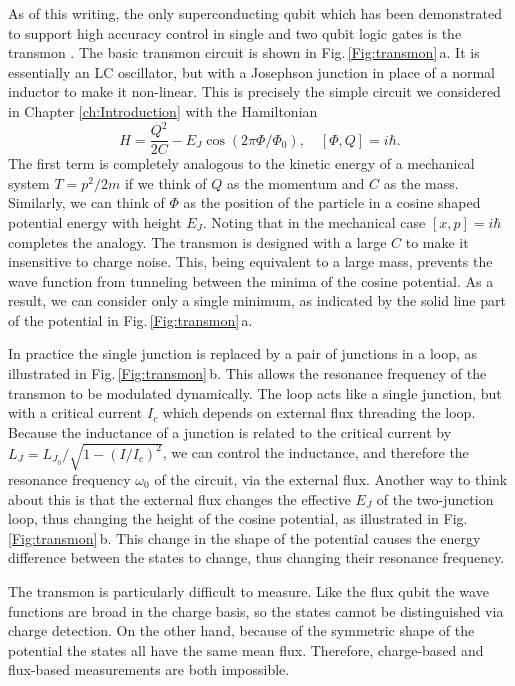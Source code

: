 As of this writing, the only superconducting qubit which has been demonstrated to support high accuracy control in single and two qubit logic gates is the transmon \cite{Koch:transmon2007, Barends:gates2014}.
The basic transmon circuit is shown in Fig.\,\ref{Fig:transmon}\,a.
It is essentially an LC oscillator, but with a Josephson junction in place of a normal inductor to make it non-linear.
This is precisely the simple circuit we considered in Chapter \ref{ch:Introduction} with the Hamiltonian \begin{equation}
H = \frac{Q^2}{2C} - E_J \cos \left( 2\pi \Phi / \Phi_0 \right), \quad [\Phi, Q]=i\hbar. \end{equation}
The first term is completely analogous to the kinetic energy of a mechanical system $T = p^2 / 2m$ if we think of $Q$ as the momentum and $C$ as the mass.
Similarly, we can think of $\Phi$ as the position of the particle in a cosine shaped potential energy with height $E_J$.
Noting that in the mechanical case $[x,p]=i\hbar$ completes the analogy.
The transmon is designed with a large $C$ to make it insensitive to charge noise.
This, being equivalent to a large mass, prevents the wave function from tunneling between the minima of the cosine potential.
As a result, we can consider only a single minimum, as indicated by the solid line part of the potential in Fig.\,\ref{Fig:transmon}\,a.

In practice the single junction is replaced by a pair of junctions in a loop, as illustrated in Fig.\,\ref{Fig:transmon}\,b.
This allows the resonance frequency of the transmon to be modulated dynamically.
The loop acts like a single junction, but with a critical current $I_c$ which depends on external flux threading the loop.
Because the inductance of a junction is related to the critical current by $L_J = L_{J_0}/\sqrt{1 - \left( I/I_c \right)^2}$, we can control the inductance, and therefore the resonance frequency $\omega_{0}$ of the circuit, via the external flux.
Another way to think about this is that the external flux changes the effective $E_J$ of the two-junction loop, thus changing the height of the cosine potential, as illustrated in Fig.\,\ref{Fig:transmon}\,b.
This change in the shape of the potential causes the energy difference between the states to change, thus changing their resonance frequency.

The transmon is particularly difficult to measure.
Like the flux qubit the wave functions are broad in the charge basis, so the states cannot be distinguished via charge detection.
On the other hand, because of the symmetric shape of the potential the states all have the same mean flux.
Therefore, charge-based and flux-based measurements are both impossible.

